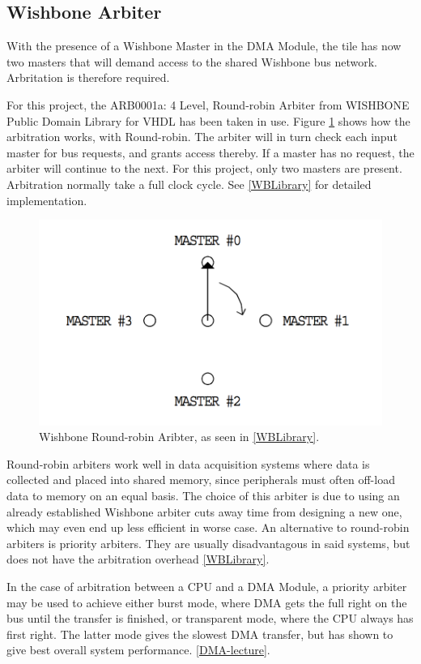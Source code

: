 \subsection{Wishbone Arbiter}
With the presence of a Wishbone Master in the DMA Module, the tile has now two masters that will demand access to the shared Wishbone bus network. 
Arbritation is therefore required.

For this project, the ARB0001a: 4 Level, Round-robin Arbiter from WISHBONE Public Domain Library for VHDL has been taken in use.
Figure \ref{fig:WBArbiter} shows how the arbitration works, with Round-robin.
The arbiter will in turn check each input master for bus requests, and grants access thereby.
If a master has no request, the arbiter will continue to the next.
For this project, only two masters are present.
Arbitration normally take a full clock cycle.
See \ref{WBLibrary} for detailed implementation.

\begin{figure}[htb]
    \centering
    \includegraphics[width=1.0\textwidth]{Figures/Tile/WBArbiter}
    \caption{Wishbone Round-robin Aribter, as seen in \ref{WBLibrary}.}
    \label{fig:WBArbiter}
\end{figure}

Round-robin arbiters work well in data acquisition systems where data is collected and placed into shared memory, since peripherals must often off-load data to memory on an equal basis.
The choice of this arbiter is due to using an already established Wishbone arbiter cuts away time from designing a new one, which may even end up less efficient in worse case.
An alternative to round-robin arbiters is priority arbiters.
They are usually disadvantagous in said systems, but does not have the arbitration overhead \ref{WBLibrary}.

In the case of arbitration between a CPU and a DMA Module, a priority arbiter may be used to achieve either burst mode, where DMA gets the full right on the bus until the transfer is finished, or transparent mode, where the CPU always has first right.
The latter mode gives the slowest DMA transfer, but has shown to give best overall system performance.  \ref{DMA-lecture}.

